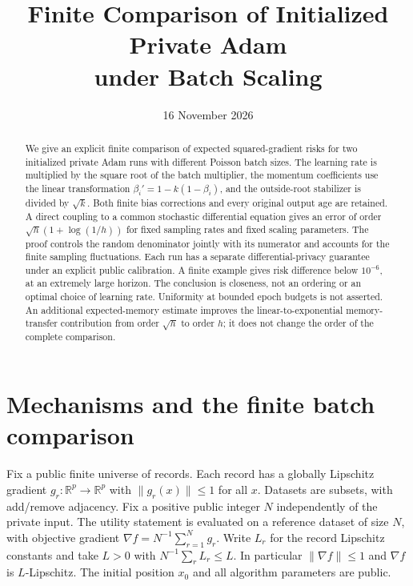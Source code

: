 \documentclass[a4paper,11pt]{article}
\title{Finite Comparison of Initialized Private Adam\\under Batch Scaling}
\author{}
\date{16 November 2026}
\theoremstyle{remark}
\newcommand{\R}{\mathbb R}
\newcommand{\norm}[1]{\lVert#1\rVert}
\begin{document}
\maketitle
\begin{abstract}
We give an explicit finite comparison of expected squared-gradient risks for
two initialized private Adam runs with different Poisson batch sizes. The
learning rate is multiplied by the square root of the batch multiplier,
the momentum coefficients use the linear transformation
$\beta_i'=1-k(1-\beta_i)$, and the outside-root stabilizer is divided by
$\sqrt{k}$. Both finite bias corrections and every original output age are
retained. A direct coupling to a common stochastic differential equation gives
an error of order $\sqrt h(1+\log(1/h))$ for fixed sampling rates and fixed scaling
parameters. The proof controls the random denominator jointly with its
numerator and accounts for the finite sampling fluctuations. Each run has a
separate differential-privacy guarantee under an explicit public calibration.
A finite example gives risk difference below $10^{-6}$, at an extremely large
horizon. The conclusion is closeness, not an ordering or an optimal choice of
learning rate. Uniformity at bounded epoch budgets is not asserted.
An additional expected-memory estimate improves the linear-to-exponential
memory-transfer contribution from order $\sqrt h$ to order $h$; it does not
change the order of the complete comparison.
\end{abstract}

\section{Mechanisms and the finite batch comparison}
\label{sec:main}

Fix a public finite universe of records. Each record has a globally Lipschitz
gradient $g_r:\R^p\to\R^p$ with $\norm{g_r(x)}\le1$ for all $x$.
Datasets are subsets, with add/remove adjacency. Fix a positive public
integer $N$ independently of the private input. The utility statement is
evaluated on a reference dataset of size $N$, with objective gradient
$\nabla f=N^{-1}\sum_{r=1}^N g_r$. Write $L_r$ for the record Lipschitz
constants and take $L>0$ with $N^{-1}\sum_rL_r\le L$. In particular
$\norm{\nabla f}\le1$ and $\nabla f$ is $L$-Lipschitz.
The initial position $x_0$ and all algorithm parameters are public.
\end{document}
